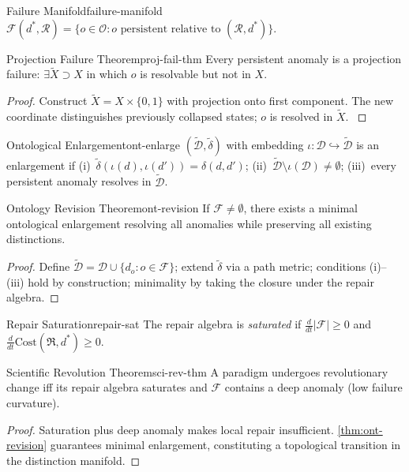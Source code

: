 \documentclass[12pt,twoside,openright]{book}
\newcommand{\repair}{\mathfrak{R}}
\begin{document}
\begin{definition}{Failure Manifold}{failure-manifold}
  $\mathcal{F}(d^*,\mathcal{R})=\{o\in\mathcal{O}:
  o\text{ persistent relative to }(\mathcal{R},d^*)\}$.
\end{definition}

\begin{theorem}{Projection Failure Theorem}{proj-fail-thm}
  Every persistent anomaly is a projection failure:
  $\exists\tilde{X}\supset X$ in which $o$ is resolvable
  but not in $X$.
\end{theorem}
\begin{proof}
  Construct $\tilde{X}=X\times\{0,1\}$ with projection
  onto first component. The new coordinate distinguishes
  previously collapsed states; $o$ is resolved in
  $\tilde{X}$. \parencite{kuhn1962structure}
\end{proof}

\begin{definition}{Ontological Enlargement}{ont-enlarge}
  $(\tilde{\mathcal{D}},\tilde\delta)$ with embedding
  $\iota:\mathcal{D}\hookrightarrow\tilde{\mathcal{D}}$ is
  an enlargement if (i)~$\tilde\delta(\iota(d),\iota(d'))
  =\delta(d,d')$; (ii)~$\tilde{\mathcal{D}}\setminus
  \iota(\mathcal{D})\ne\emptyset$;
  (iii)~every persistent anomaly resolves in
  $\tilde{\mathcal{D}}$.
\end{definition}

\begin{theorem}{Ontology Revision Theorem}{ont-revision}
  If $\mathcal{F}\ne\emptyset$, there exists a minimal
  ontological enlargement resolving all anomalies
  while preserving all existing distinctions.
\end{theorem}
\begin{proof}
  Define $\tilde{\mathcal{D}}=\mathcal{D}\cup
  \{d_o:o\in\mathcal{F}\}$; extend $\tilde\delta$ via
  a path metric; conditions (i)--(iii) hold by
  construction; minimality by taking the closure under
  the repair algebra.
\end{proof}

\begin{definition}{Repair Saturation}{repair-sat}
  The repair algebra is \emph{saturated} if
  $\frac{d}{dt}|\mathcal{F}|\ge0$ and
  $\frac{d}{dt}\mathrm{Cost}(\repair,d^*)\ge0$.
\end{definition}

\begin{theorem}{Scientific Revolution Theorem}{sci-rev-thm}
  A paradigm undergoes revolutionary change iff its repair
  algebra saturates and $\mathcal{F}$ contains a deep
  anomaly (low failure curvature).
  \parencite{kuhn1962structure,lakatos1978}
\end{theorem}
\begin{proof}
  Saturation plus deep anomaly makes local repair
  insufficient. \cref{thm:ont-revision} guarantees
  minimal enlargement, constituting a topological
  transition in the distinction manifold.
\end{proof}
\end{document}
